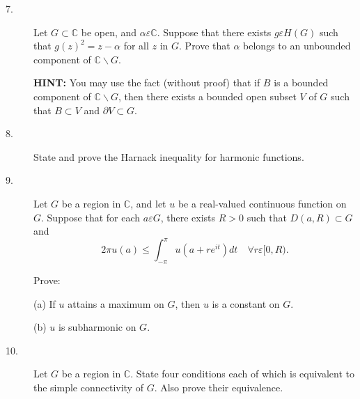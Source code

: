 \documentclass{article}
\def\C{\mathbb C}
\begin{document}
\begin{description}
\item[7.]
Let $G \subset \C$ be open, and $\alpha \varepsilon \C$. Suppose that there
exists $g \varepsilon H(G)$ such that $g(z)^2 = z- \alpha$ for all
$z$ in $G$. Prove that $\alpha$ belongs to an unbounded component of
$\C \backslash G$.

{\bf HINT:} You may use the fact (without proof) that if $B$ is a bounded
component of $\C \backslash G$, then there exists a bounded open subset
$V$ of $G$ such that $B \subset V$ and $\partial V \subset G$.

\item[8.]
State and prove the Harnack inequality for harmonic functions.

\item[9.]
Let $G$ be a region in $\C$, and let $u$ be a real-valued continuous
function on $G$. Suppose that for each $a \varepsilon G$, there exists
$R>0$ such that $D(a,R) \subset G$ and
$$2 \pi u (a) \leq \int^\pi_{-\pi} u(a+re^{it})dt \quad \forall r \varepsilon
  [0,R).$$

Prove:

(a) If $u$ attains a maximum on $G$, then $u$ is a constant on $G$.

(b) $u$ is subharmonic on $G$.

\item[10.]
Let $G$ be a region in $\C$. State four conditions each of which is equivalent
to the simple connectivity of $G$. Also prove their equivalence.






\end{description}    
\end{document}
